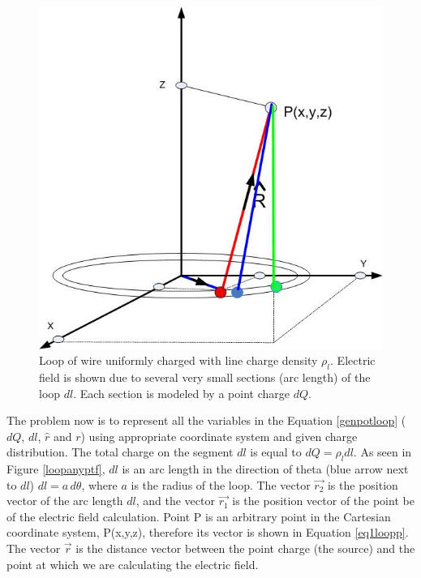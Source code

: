 \documentclass{ximera}
\begin{document}
\begin{figure}[htbp]
\begin{center}
\includegraphics[scale=0.4]{../jpg/ringefieldanywheremorechargespot.jpg}
\end{center}
\caption{Loop of wire uniformly charged with line charge density $\rho_l$. Electric field is shown due to several very small sections (arc length) of the loop $dl$.
Each section is modeled by a point charge $dQ$.}
\label{loopanypt1}
\end{figure}



The problem now  is to represent all the variables in the Equation \ref{genpotloop}  ( $dQ$, $dl$, $\hat{r}$ and $r$) using  appropriate coordinate system and given charge distribution.
The  total charge on the segment $dl$ is equal to $dQ=\rho_l dl$. As seen in Figure \ref{loopanyptf}, $dl$ is an arc length in the direction of theta (blue arrow next to $dl$) $dl=a\, d\theta$, where $ a$ is the radius of the loop. The vector $\vec{r_2}$ is the position vector of the arc length $dl$, and the vector $\vec{r_1}$  is the position vector of the point be of the electric field calculation. Point P is an arbitrary point in the Cartesian coordinate system, P(x,y,z), therefore its vector is shown in Equation \ref{eq1loopp}.  The vector $\vec{r}$ is the distance vector between the point charge (the source) and the point at which we are calculating the electric field. 
\end{document}
